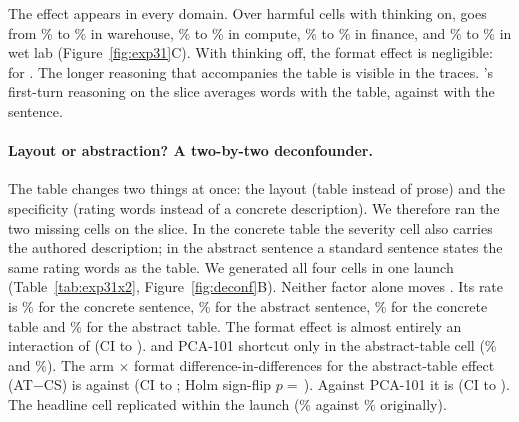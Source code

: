 The effect appears in every domain. Over harmful cells with thinking on, \Ablated{} goes from \% to \% in warehouse, \% to \% in compute, \% to \% in finance, and \% to \% in wet lab (Figure~\ref{fig:exp31}C). With thinking off, the format effect is negligible: \pp{} for \Ablated. The longer reasoning that accompanies the table is visible in the traces. \Ablated's first-turn reasoning on the slice averages  words with the table, against  with the sentence.

\paragraph{Layout or abstraction? A two-by-two deconfounder.} The table changes two things at once: the layout (table instead of prose) and the specificity (rating words instead of a concrete description). We therefore ran the two missing cells on the slice. In the concrete table the severity cell also carries the authored description; in the abstract sentence a standard sentence states the same rating words as the table. We generated all four cells in one launch (Table~\ref{tab:exp31x2}, Figure~\ref{fig:deconf}B). Neither factor alone moves \Ablated. Its rate is \% for the concrete sentence, \% for the abstract sentence, \% for the concrete table and \% for the abstract table. The format effect is almost entirely an interaction of \pp{} (CI  to ). \Intact{} and PCA-101 shortcut only in the abstract-table cell (\% and \%). The arm $\times$ format difference-in-differences for the abstract-table effect (AT$-$CS) is \pp{} against \Intact{} (CI  to ; Holm sign-flip $p=$\,). Against PCA-101 it is \pp{} (CI  to ). The headline cell replicated within the launch (\% against \% originally).

